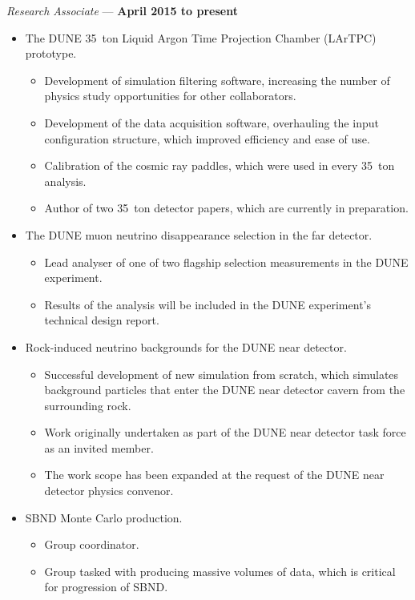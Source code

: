 \documentclass[margin,line]{res}
\begin{document}
\begin{resume}
\vspace{-.3cm}
{\em Research Associate} --- {\bf April 2015 to present}%
\begin{itemize}
\item The DUNE 35~ton Liquid Argon Time Projection Chamber (LArTPC) prototype.
\begin{itemize}
\item Development of simulation filtering software, increasing the number of physics study opportunities for other collaborators.
\item Development of the data acquisition software, overhauling the input configuration structure, which improved efficiency and ease of use.
\item Calibration of the cosmic ray paddles, which were used in every 35~ton analysis.
\item Author of two 35~ton detector papers, which are currently in preparation.
\end{itemize}
\item The DUNE muon neutrino disappearance selection in the far detector.
\begin{itemize}
\item Lead analyser of one of two flagship selection measurements in the DUNE experiment.
\item Results of the analysis will be included in the DUNE experiment's technical design report.
\end{itemize}
\item Rock-induced neutrino backgrounds for the DUNE near detector.
\begin{itemize}
\item Successful development of new simulation from scratch, which simulates background particles that enter the DUNE near detector cavern from the surrounding rock.
\item Work originally undertaken as part of the DUNE near detector task force as an invited member.
\item The work scope has been expanded at the request of the DUNE near detector physics convenor.
\end{itemize}
\item SBND Monte Carlo production.
\begin{itemize}
\item Group coordinator.
\item Group tasked with producing massive volumes of data,  which is critical for progression of SBND.

\end{itemize}
\end{itemize}
\end{resume}
\end{document}
